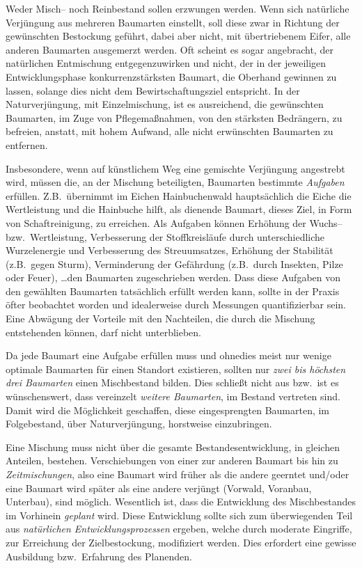 \documentclass[twocolumn]{scrartcl}
\begin{document}
Weder Misch-- noch Reinbestand sollen erzwungen werden. Wenn sich
natürliche Verjüngung aus mehreren Baumarten einstellt, soll diese zwar
in Richtung der gewünschten Bestockung geführt, dabei aber nicht, mit
übertriebenem Eifer, alle anderen Baumarten ausgemerzt werden. Oft
scheint es sogar angebracht, der natürlichen Entmischung
entgegenzuwirken und nicht, der in der jeweiligen Entwicklungsphase
konkurrenzstärksten Baumart, die Oberhand gewinnen zu lassen, solange
dies nicht dem Bewirtschaftungsziel entspricht. In der
Naturverjüngung, mit Einzelmischung, ist es ausreichend, die
gewünschten Baumarten, im Zuge von Pflegemaßnahmen, von den stärksten
Bedrängern, zu befreien, anstatt, mit hohem Aufwand, alle nicht
erwünschten Baumarten zu entfernen.

Insbesondere, wenn auf künstlichem Weg eine gemischte Verjüngung
angestrebt wird, müssen die, an der Mischung beteiligten, Baumarten
bestimmte \emph{Aufgaben} erfüllen. Z.B.\ übernimmt im Eichen
Hainbuchenwald hauptsächlich die Eiche die Wertleistung und die
Hainbuche hilft, als dienende Baumart, dieses Ziel, in Form von
Schaftreinigung, zu erreichen. Als Aufgaben können Erhöhung der
Wuchs-- bzw.\ Wertleistung, Verbesserung der Stoffkreisläufe durch
unterschiedliche Wurzelenergie und Verbesserung des Streuumsatzes,
Erhöhung der Stabilität (z.B.\ gegen Sturm), Verminderung der
Gefährdung (z.B.\ durch Insekten, Pilze oder Feuer), \dots den
Baumarten zugeschrieben werden. Dass diese Aufgaben von den gewählten
Baumarten tatsächlich erfüllt werden kann, sollte in der Praxis öfter
beobachtet worden und idealerweise durch Messungen quantifizierbar
sein. Eine Abwägung der Vorteile mit den Nachteilen, die durch die Mischung entstehenden können, darf nicht unterblieben.

Da jede Baumart eine Aufgabe erfüllen muss und ohnedies meist nur
wenige optimale Baumarten für einen Standort existieren, sollten nur
\emph{zwei bis höchsten drei Baumarten} einen Mischbestand
bilden. Dies schließt nicht aus bzw.\ ist es wünschenswert, dass
vereinzelt \emph{weitere Baumarten}, im Bestand vertreten sind. Damit
wird die Möglichkeit geschaffen, diese eingesprengten Baumarten, im
Folgebestand, über Naturverjüngung, horstweise einzubringen.

Eine Mischung muss nicht über die gesamte Bestandesentwicklung, in
gleichen Anteilen, bestehen. Verschiebungen von einer zur anderen
Baumart bis hin zu \emph{Zeitmischungen}, also eine Baumart wird
früher als die andere geerntet und/oder eine Baumart wird später als
eine andere verjüngt (Vorwald, Voranbau, Unterbau), sind
möglich. Wesentlich ist, dass die Entwicklung des Mischbestandes im
Vorhinein \emph{geplant} wird. Diese Entwicklung sollte sich zum
überwiegenden Teil aus \emph{natürlichen Entwicklungsprozessen}
ergeben, welche durch moderate Eingriffe, zur Erreichung der
Zielbestockung, modifiziert werden. Dies erfordert eine gewisse
Ausbildung bzw.\ Erfahrung des Planenden.
\end{document}
